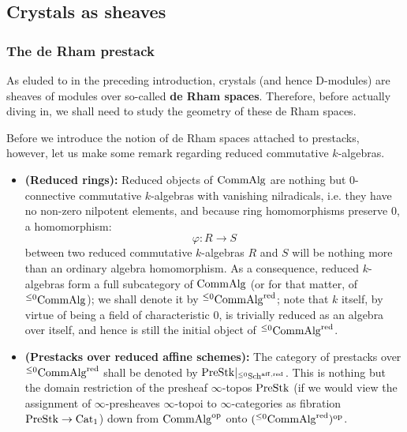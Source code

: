         \subsection{Crystals as sheaves}
            \subsubsection{The de Rham prestack}
                As eluded to in the preceding introduction, crystals (and hence D-modules) are sheaves of modules over so-called \textbf{de Rham spaces}. Therefore, before actually diving in, we shall need to study the geometry of these de Rham spaces.
            
                Before we introduce the notion of de Rham spaces attached to prestacks, however, let us make some remark regarding reduced commutative $k$-algebras. 
                \begin{remark} \label{remark: reduced_affine_schemes}
                    \noindent
                    \begin{itemize}
                        \item \textbf{(Reduced rings):} Reduced objects of $\mathrm{Comm}\mathrm{Alg}$ are nothing but $0$-connective commutative $k$-algebras with vanishing nilradicals, i.e. they have no non-zero nilpotent elements, and because ring homomorphisms preserve $0$, a homomorphism:
                            $$\varphi: R \to S$$
                        between two reduced commutative $k$-algebras $R$ and $S$ will be nothing more than an ordinary algebra homomorphism. As a consequence, reduced $k$-algebras form a full subcategory of $\mathrm{Comm}\mathrm{Alg}$ (or for that matter, of ${}^{\leq 0}\mathrm{Comm}\mathrm{Alg}$); we shall denote it by ${}^{\leq 0}\mathrm{Comm}\mathrm{Alg}^{\mathrm{red}}$; note that $k$ itself, by virtue of being a field of characteristic $0$, is trivially reduced as an algebra over itself, and hence is still the initial object of ${}^{\leq 0}\mathrm{Comm}\mathrm{Alg}^{\mathrm{red}}$. 
                        \item \textbf{(Prestacks over reduced affine schemes):} The category of prestacks over ${}^{\leq 0}\mathrm{Comm}\mathrm{Alg}^{\mathrm{red}}$ shall be denoted by $\mathrm{Pre}\mathrm{Stk}|_{{}^{\leq 0}\mathrm{Sch}^{\mathrm{aff}, \mathrm{red}}}$. This is nothing but the domain restriction of the presheaf $\infty$-topos $\mathrm{Pre}\mathrm{Stk}$ (if we would view the assignment of $\infty$-presheaves $\infty$-topoi to $\infty$-categories as fibration $\mathrm{Pre}\mathrm{Stk} \to \mathrm{Cat}_1$) down from $\mathrm{Comm}\mathrm{Alg}^{\mathrm{op}}$ onto $({}^{\leq 0}\mathrm{Comm}\mathrm{Alg}^{\mathrm{red}})^{\mathrm{op}}$. 
                    \end{itemize}
                \end{remark}
                
